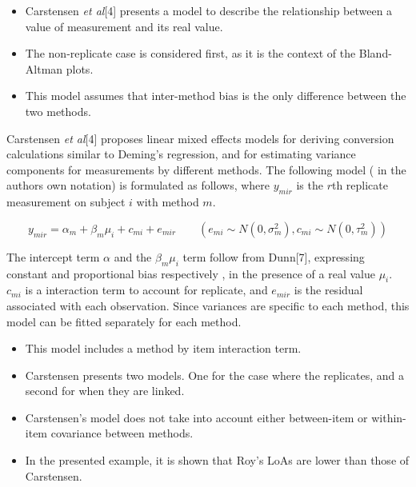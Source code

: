 \documentclass{report}
\begin{document}
%
\begin{itemize}
	\item Carstensen \textit{et al}[4] presents a model to describe the relationship between a value of measurement and its real value.
	\item The non-replicate case is considered first, as it is the context of the Bland-Altman plots.
	\item This model assumes that inter-method bias is the only difference between the two methods.
\end{itemize}%

Carstensen \textit{et al}[4] proposes linear mixed effects models for deriving
conversion calculations similar to Deming's regression, and for
estimating variance components for measurements by different
methods. The following model ( in the authors own notation) is
formulated as follows, where $y_{mir}$ is the $r$th replicate
measurement on subject $i$ with method $m$.

\begin{equation}
	y_{mir}  = \alpha_{m} + \beta_{m}\mu_{i} + c_{mi} + e_{mir} \qquad
	( e_{mi} \sim N(0,\sigma^{2}_{m}), c_{mi} \sim N(0,\tau^{2}_{m}))
\end{equation}

%
The intercept term $\alpha$ and the $\beta_{m}\mu_{i}$ term follow
from Dunn[7], expressing constant and proportional bias
respectively , in the presence of a real value $\mu_{i}.$
$c_{mi}$ is a interaction term to account for replicate, and
$e_{mir}$ is the residual associated with each observation.
Since variances are specific to each method, this model can be
fitted separately for each method.

%
\begin{itemize}
	\item This model includes a method by item interaction term.\\
	
	\item Carstensen presents two models. One for the case where the replicates, and a second for when they are linked.\\
	\item Carstensen's model does not take into account either between-item or within-item covariance between methods.\\
	\item In the presented example, it is shown that Roy's LoAs are lower than those of Carstensen.
\end{itemize}
\end{document}
